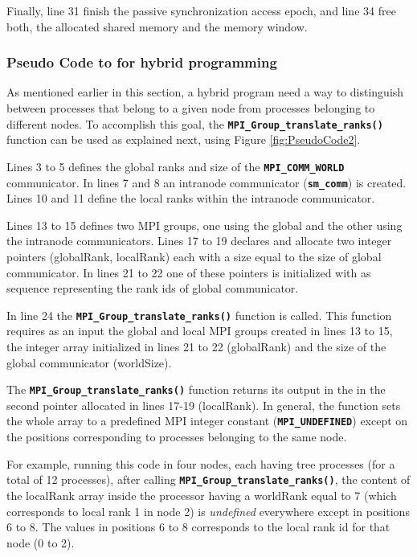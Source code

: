 Finally, line 31 finish the passive synchronization access epoch, and line 34 free both, the allocated shared memory and the memory window.


\subsubsection*{Pseudo Code to for hybrid programming}

As mentioned earlier in this section, a hybrid program need a way to distinguish between processes that belong to a given node from processes belonging to different nodes. To accomplish this goal, the \textbf{\texttt{MPI\_Group\_translate\_ranks()}} function can be used as explained next, using Figure \ref{fig:PseudoCode2}.
 

\medskip

Lines 3 to 5 defines the global ranks and size of the \textbf{\texttt{MPI\_COMM\_WORLD}} communicator. In lines 7 and 8 an intranode communicator (\textbf{\texttt{sm\_comm}}) is created. Lines 10 and 11 define the local ranks within the intranode communicator.

\medskip

Lines 13 to 15 defines two MPI groups, one using the global and the other using the intranode communicators. Lines 17 to 19 declares and allocate two integer pointers (globalRank, localRank) each with a size equal to the size of global communicator. In lines 21 to 22 one of these pointers is initialized with as sequence representing the rank ids of global communicator.

\medskip

In line 24 the \textbf{\texttt{MPI\_Group\_translate\_ranks()}} function is called. This function requires as an input the global and local MPI groups created in lines 13 to 15, the integer array initialized in lines 21 to 22 (globalRank) and the size of the global communicator (worldSize). 

\medskip

The \textbf{\texttt{MPI\_Group\_translate\_ranks()}} function returns its output in the in the second pointer allocated in lines 17-19 (localRank). In general, the function sets the whole array to a predefined MPI integer constant (\textbf{\texttt{MPI\_UNDEFINED}}) except on the positions corresponding to processes belonging to the same node. 

\medskip

For example, running this code in four nodes, each having tree processes (for a total of 12 processes), after calling \textbf{\texttt{MPI\_Group\_translate\_ranks()}}, the content of the localRank array inside the processor having a worldRank equal to 7 (which corresponds to local rank 1 in node 2) is \emph{undefined} everywhere except in positions 6 to 8. The values in positions 6 to 8 corresponds to the local rank id for that node (0 to 2).



